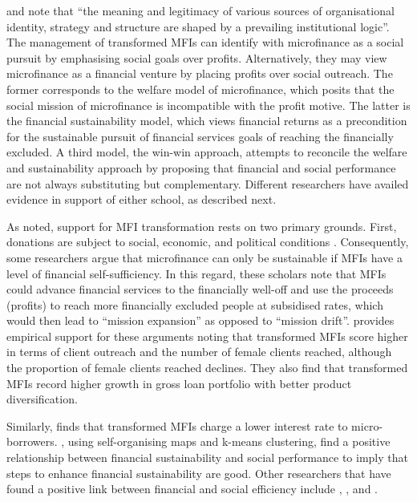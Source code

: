 \documentclass[a4paper, nobind]{templates/ociamthesis}
\begin{document}
\textcite{thornton2002rise} and \textcite{thornton2015institutional} note that ``the meaning and legitimacy of various sources of organisational identity, strategy and structure are shaped by a prevailing institutional logic''. The management of transformed MFIs can identify with microfinance as a social pursuit by emphasising social goals over profits. Alternatively, they may view microfinance as a financial venture by placing profits over social outreach. The former corresponds to the welfare model of microfinance, which posits that the social mission of microfinance is incompatible with the profit motive. The latter is the financial sustainability model, which views financial returns as a precondition for the sustainable pursuit of financial services goals of reaching the financially excluded. A third model, the win-win approach, attempts to reconcile the welfare and sustainability approach by proposing that financial and social performance are not always substituting but complementary. Different researchers have availed evidence in support of either school, as described next.

As noted, support for MFI transformation rests on two primary grounds. First, donations are subject to social, economic, and political conditions \autocite{garmaise2013cheap,armendariz2013subsidy,d2017aid}. Consequently, some researchers argue that microfinance can only be sustainable if MFIs have a level of financial self-sufficiency. In this regard, these scholars note that MFIs could advance financial services to the financially well-off and use the proceeds (profits) to reach more financially excluded people at subsidised rates, which would then lead to ``mission expansion'' as opposed to ``mission drift''. \textcite{frank2008stemming} provides empirical support for these arguments noting that transformed MFIs score higher in terms of client outreach and the number of female clients reached, although the proportion of female clients reached declines. They also find that transformed MFIs record higher growth in gross loan portfolio with better product diversification.

Similarly, \textcite{d2017ngos} finds that transformed MFIs charge a lower interest rate to micro-borrowers. \textcite{louis2013financial}, using self-organising maps and k-means clustering, find a positive relationship between financial sustainability and social performance to imply that steps to enhance financial sustainability are good. Other researchers that have found a positive link between financial and social efficiency include \textcite{gutierrez2009social}, \textcite{mersland2010microfinance}, and \textcite{quayes2012depth}.
\end{document}
